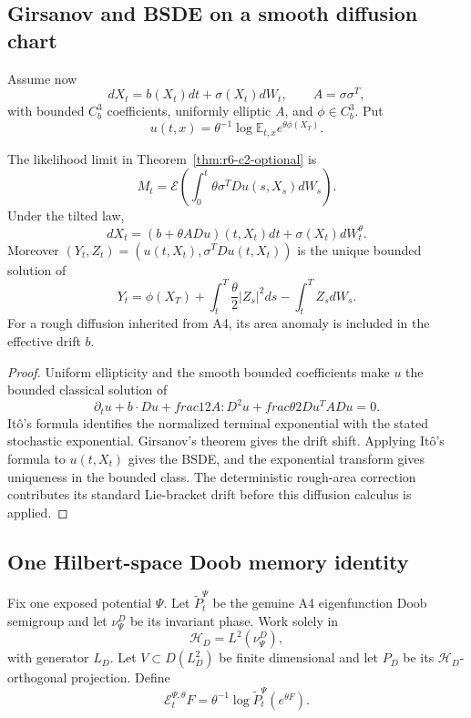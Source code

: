 \subsection{Girsanov and BSDE on a smooth diffusion chart}

Assume now
\[
dX_t=b(X_t)dt+\sigma(X_t)dW_t,
\qquad A=\sigma\sigma^T,
\]
with bounded \(C_b^3\) coefficients, uniformly elliptic \(A\), and
\(\phi\in C_b^3\).  Put
\[
u(t,x)=\theta^{-1}\log
\mathbb E_{t,x}e^{\theta\phi(X_T)}.
\]

\begin{theorem}
\label{thm:r6-c2-girsanov}
The likelihood limit in Theorem~\ref{thm:r6-c2-optional} is
\[
M_t=\mathcal E\left(
\int_0^t\theta\sigma^TDu(s,X_s)dW_s
\right).
\]
Under the tilted law,
\[
dX_t=(b+\theta A Du)(t,X_t)dt+\sigma(X_t)dW_t^\theta.
\]
Moreover
\((Y_t,Z_t)=(u(t,X_t),\sigma^TDu(t,X_t))\) is the unique bounded solution of
\[
Y_t=\phi(X_T)+
\int_t^T\frac\theta2|Z_s|^2ds-
\int_t^TZ_sdW_s.
\]
For a rough diffusion inherited from A4, its area anomaly is included in the
effective drift \(b\).
\end{theorem}

\begin{proof}
Uniform ellipticity and the smooth bounded coefficients make \(u\) the bounded
classical solution of
\[
\partial_tu+b\cdot Du+	frac12A:D^2u+	frac\theta2Du^TADu=0.
\]
Itô's formula identifies the normalized terminal exponential with the stated
stochastic exponential.  Girsanov's theorem gives the drift shift.  Applying
Itô's formula to \(u(t,X_t)\) gives the BSDE, and the exponential transform
gives uniqueness in the bounded class.  The deterministic rough-area
correction contributes its standard Lie-bracket drift before this diffusion
calculus is applied.
\end{proof}

\subsection{One Hilbert-space Doob memory identity}

Fix one exposed potential \(\Psi\).  Let
\(\widetilde P_t^\Psi\) be the genuine A4 eigenfunction Doob semigroup and let
\(\nu_\Psi^D\) be its invariant phase.  Work solely in
\[
\mathcal H_D=L^2(\nu_\Psi^D),
\]
with generator \(L_D\).  Let \(V\subset D(L_D^2)\) be finite dimensional and
let \(P_D\) be its \(\mathcal H_D\)-orthogonal projection.  Define
\[
\mathcal E_t^{\Psi,\theta}F
=\theta^{-1}\log
\widetilde P_t^\Psi(e^{\theta F}).
\]

